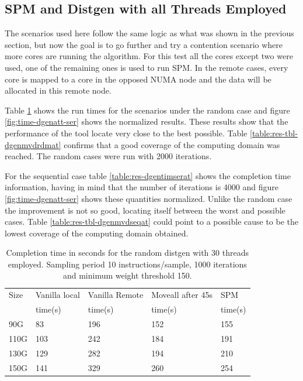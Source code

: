 \subsection{SPM and Distgen with all Threads Employed}\label{subsection:res-spmydistgen-at}

The scenarios used here follow the same logic as what was shown in the previous section, but now the goal is to go further and try a contention scenario where more cores are running the algorithm. For this test all the cores except two were used, one of the remaining ones is used to run SPM. In the remote cases, every core is mapped to a core in the opposed NUMA node and the data will be allocated in this remote node.

Table \ref{table:res-dgentimrdmat} shows the run times for the scenarios under the random case and figure \ref{fig:time-dgenatt-ser} shows the normalized results. These results show that the performance of the tool locate very close to the best possible. Table \ref{table:res-tbl-dgenmvdrdmat} confirms that a good coverage of the computing domain was reached. The random cases were run with 2000 iterations.

For the sequential case table \ref{table:res-dgentimserat} shows the completion time information, having in mind that the number of iterations is 4000 and figure \ref{fig:time-dgenatt-ser} shows these quantities normalized. Unlike the random case the improvement is not so good, locating itself between the worst and possible cases. Table \ref{table:res-tbl-dgenmvdseqat} could point to a possible cause to be the lowest coverage of the computing domain obtained.

\begin{table}[th]
	\centering
		\begin{tabularx}{.9\textwidth}{|l|l|l|l|X|}
		\hline
			Size & Vanilla local & Vanilla Remote & Moveall after 45s & SPM \\
			 & time(s) & time(s) & time(s) & time(s)  \\
			\hline
			90G & 83 & 196 & 152 & 155\\
			\hline
			110G & 103 & 242 & 184 & 191\\
			\hline
			130G & 129 & 282 &194 & 210\\
			\hline
			150G & 141 & 329 & 260 & 254\\
			\hline
		\end{tabularx}
		\caption{Completion time in seconds for the random distgen with 30 threads employed. Sampling period 10 instructions/sample, 1000 iterations and minimum weight threshold 150.}
		\label{table:res-dgentimrdmat}
\end{table}


